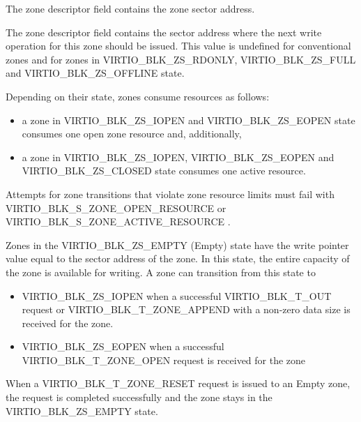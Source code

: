 The zone descriptor field  contains the zone sector address.

The zone descriptor field  contains the sector address where the
next write operation for this zone should be issued. This value is undefined
for conventional zones and for zones in VIRTIO_BLK_ZS_RDONLY,
VIRTIO_BLK_ZS_FULL and VIRTIO_BLK_ZS_OFFLINE state.

Depending on their state, zones consume resources as follows:
\begin{itemize}
\item a zone in VIRTIO_BLK_ZS_IOPEN and VIRTIO_BLK_ZS_EOPEN state consumes one
    open zone resource and, additionally,

\item a zone in VIRTIO_BLK_ZS_IOPEN, VIRTIO_BLK_ZS_EOPEN and
    VIRTIO_BLK_ZS_CLOSED state consumes one active resource.
\end{itemize}

Attempts for zone transitions that violate zone resource limits must fail with
VIRTIO_BLK_S_ZONE_OPEN_RESOURCE or VIRTIO_BLK_S_ZONE_ACTIVE_RESOURCE
.

Zones in the VIRTIO_BLK_ZS_EMPTY (Empty) state have the write pointer value
equal to the sector address of the zone. In this state, the entire capacity of
the zone is available for writing. A zone can transition from this state to
\begin{itemize}
\item VIRTIO_BLK_ZS_IOPEN when a successful VIRTIO_BLK_T_OUT request or
    VIRTIO_BLK_T_ZONE_APPEND with a non-zero data size is received for the zone.

\item VIRTIO_BLK_ZS_EOPEN when a successful VIRTIO_BLK_T_ZONE_OPEN request is
    received for the zone
\end{itemize}

When a VIRTIO_BLK_T_ZONE_RESET request is issued to an Empty zone, the request
is completed successfully and the zone stays in the VIRTIO_BLK_ZS_EMPTY state.

